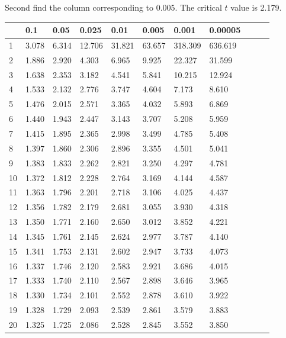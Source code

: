 \begin{frame}
{\small Second find the column corresponding to 0.005. The critical $t$ value is 2.179.}

  {
\fontsize{5pt}{5pt}
\selectfont

\begin{tabular}{l|ll>{\columncolor{blue}}llllllll}
 & 0.1&0.05&0.025&0.01&0.005&0.001&0.00005\\ \hline
 1 & 3.078 & 6.314 & 12.706 & 31.821 & 63.657 & 318.309 & 636.619 \\ 
 2 & 1.886 & 2.920 & 4.303 & 6.965 & 9.925 & 22.327 & 31.599 \\ 
 3 & 1.638 & 2.353 & 3.182 & 4.541 & 5.841 & 10.215 & 12.924 \\ 
 4 & 1.533 & 2.132 & 2.776 & 3.747 & 4.604 & 7.173 & 8.610 \\ 
 5 & 1.476 & 2.015 & 2.571 & 3.365 & 4.032 & 5.893 & 6.869 \\ 
[5pt]
 6 & 1.440 & 1.943 & 2.447 & 3.143 & 3.707 & 5.208 & 5.959 \\ 
 7 & 1.415 & 1.895 & 2.365 & 2.998 & 3.499 & 4.785 & 5.408 \\ 
 8 & 1.397 & 1.860 & 2.306 & 2.896 & 3.355 & 4.501 & 5.041 \\ 
 9 & 1.383 & 1.833 & 2.262 & 2.821 & 3.250 & 4.297 & 4.781 \\ 
10 & 1.372 & 1.812 & 2.228 & 2.764 & 3.169 & 4.144 & 4.587 \\ 
[5pt]
11 & 1.363 & 1.796 & 2.201 & 2.718 & 3.106 & 4.025 & 4.437 \\ 
\rowcolor{red}12 & 1.356 & 1.782 & 2.179 & 2.681 & 3.055 & 3.930 & 4.318 \\ 
13 & 1.350 & 1.771 & 2.160 & 2.650 & 3.012 & 3.852 & 4.221 \\ 
14 & 1.345 & 1.761 & 2.145 & 2.624 & 2.977 & 3.787 & 4.140 \\ 
15 & 1.341 & 1.753 & 2.131 & 2.602 & 2.947 & 3.733 & 4.073 \\ 
[5pt]
16 & 1.337 & 1.746 & 2.120 & 2.583 & 2.921 & 3.686 & 4.015 \\ 
17 & 1.333 & 1.740 & 2.110 & 2.567 & 2.898 & 3.646 & 3.965 \\ 
18 & 1.330 & 1.734 & 2.101 & 2.552 & 2.878 & 3.610 & 3.922 \\ 
19 & 1.328 & 1.729 & 2.093 & 2.539 & 2.861 & 3.579 & 3.883 \\ 
20 & 1.325 & 1.725 & 2.086 & 2.528 & 2.845 & 3.552 & 3.850 \\ 

\end{tabular}}
\end{frame}
